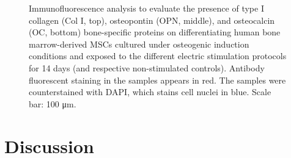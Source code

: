 \begin{figure}
\caption{Immunofluorescence analysis to evaluate the presence of type I collagen (Col I, top), osteopontin (OPN, middle), and osteocalcin (OC, bottom) bone-specific proteins on differentiating human bone marrow-derived \ac{MSCs} cultured under osteogenic induction conditions and exposed to the different electric stimulation protocols for 14 days (and respective non-stimulated controls). Antibody fluorescent staining in the samples appears in red. The samples were counterstained with DAPI, which stains cell nuclei in blue. Scale bar: 100 \si{\micro\meter}.}
\label{fig4d11}
\end{figure}


\section{Discussion}

